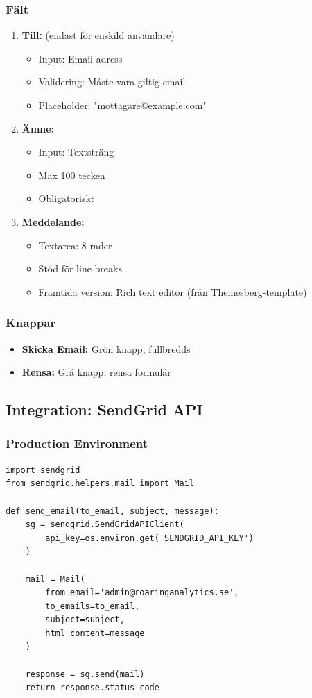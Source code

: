 \documentclass[12pt,a4paper]{article}
\begin{document}
\subsubsection{Fält}
\begin{enumerate}
  \item \textbf{Till:} (endast för enskild användare)
  \begin{itemize}
    \item Input: Email-adress
    \item Validering: Måste vara giltig email
    \item Placeholder: "mottagare@example.com"
  \end{itemize}
  
  \item \textbf{Ämne:}
  \begin{itemize}
    \item Input: Textsträng
    \item Max 100 tecken
    \item Obligatoriskt
  \end{itemize}
  
  \item \textbf{Meddelande:}
  \begin{itemize}
    \item Textarea: 8 rader
    \item Stöd för line breaks
    \item Framtida version: Rich text editor (från Themesberg-template)
  \end{itemize}
\end{enumerate}

\subsubsection{Knappar}
\begin{itemize}
  \item \textbf{Skicka Email:} Grön knapp, fullbredds
  \item \textbf{Rensa:} Grå knapp, rensa formulär
\end{itemize}

\subsection{Integration: SendGrid API}

\subsubsection{Production Environment}
\begin{lstlisting}[basicstyle=\small\ttfamily]
import sendgrid
from sendgrid.helpers.mail import Mail

def send_email(to_email, subject, message):
    sg = sendgrid.SendGridAPIClient(
        api_key=os.environ.get('SENDGRID_API_KEY')
    )
    
    mail = Mail(
        from_email='admin@roaringanalytics.se',
        to_emails=to_email,
        subject=subject,
        html_content=message
    )
    
    response = sg.send(mail)
    return response.status_code
\end{lstlisting}
\end{document}
